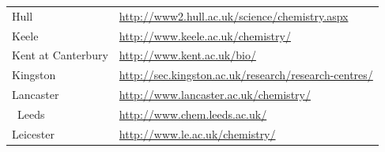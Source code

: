 \begin{table}[H]
\begin{tabular}{||p{2.5cm}|Y||}
 \footnotesize{Hull       }                        & \footnotesize{\url{http://www2.hull.ac.uk/science/chemistry.aspx}}                                                                                        \\
 \footnotesize{Keele     }                         & \footnotesize{\url{http://www.keele.ac.uk/chemistry/}}                                                                                                    \\
 \footnotesize{Kent at Canterbury}                 & \footnotesize{\url{http://www.kent.ac.uk/bio/}}                                                                                                           \\
 \footnotesize{Kingston     }                      & \footnotesize{\url{http://sec.kingston.ac.uk/research/research-centres/}}                    
 \\
 \footnotesize{Lancaster   }                       & \footnotesize{\url{http://www.lancaster.ac.uk/chemistry/}}                                                                                                \\\
\footnotesize{Leeds      }                        & \footnotesize{\url{http://www.chem.leeds.ac.uk/}}                                                                                                         \\
 \footnotesize{Leicester }                         & \footnotesize{\url{http://www.le.ac.uk/chemistry/}}                                                                                                                                                               
\\
\hline 
 \end{tabular}
 \end{table}
 
